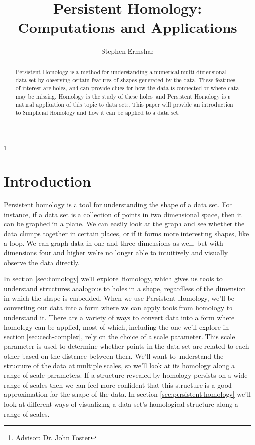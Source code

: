 

\title[Persistent Homology]{Persistent Homology: Computations and Applications}
\author{Stephen Ermshar}
\address{Walla Walla University}
\thanks{Advisor: Dr. John Foster}

\date{} %



\begin{abstract}
    Persistent Homology is a method for understanding a numerical multi dimensional data set by observing certain features of shapes generated by the data.
    These features of interest are holes, and can provide clues for how the data is connected or where data may be missing.
    Homology is the study of these holes, and Persistent Homology is a natural application of this topic to data sets.
    This paper will provide an introduction to Simplicial Homology and how it can be applied to a data set.
\end{abstract}
\maketitle

\section{Introduction}

Persistent homology is a tool for understanding the shape of a data set.
For instance, if a data set is a collection of points in two dimensional space, then it can be graphed in a plane.
We can easily look at the graph and see whether the data clumps together in certain places, or if it forms more interesting shapes, like a loop.
We can graph data in one and three dimensions as well, but with dimensions four and higher we're no longer able to intuitively and visually observe the data directly.

In section \ref{sec:homology} we'll explore Homology, which gives us tools to understand structures analogous to holes in a shape, regardless of the dimension in which the shape is embedded.
When we use Persistent Homology, we'll be converting our data into a form where we can apply tools from homology to understand it.
There are a variety of ways to convert data into a form where homology can be applied, most of which, including the one we'll explore in section \ref{sec:cech-complex}, rely on the choice of a scale parameter.
This scale parameter is used to determine whether points in the data set are related to each other based on the distance between them.
We'll want to understand the structure of the data at multiple scales, so we'll look at its homology along a range of scale parameters.
If a structure revealed by homology persists on a wide range of scales then we can feel more confident that this structure is a good approximation for the shape of the data.
In section \ref{sec:persistent-homology} we'll look at different ways of visualizing a data set's homological structure along a range of scales.

